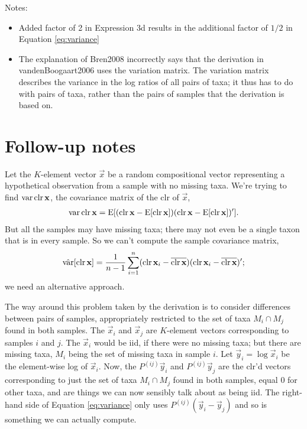 Notes:
\begin{itemize}
  \item Added factor of 2 in Expression 3d results in the additional factor of
    $1/2$ in Equation \eqref{eq:variance}
  \item The explanation of Bren2008 incorrectly says that the derivation in
    vandenBoogaart2006 uses the variation matrix. The variation matrix
    describes the variance in the log ratios of all pairs of taxa; it thus has
    to do with pairs of taxa, rather than the pairs of samples that the
    derivation is based on.
\end{itemize}

\section{Follow-up notes}

Let the $K$-element vector $\vec x$ be a random compositional vector
representing a hypothetical observation from a sample with no missing taxa.
We're trying to find $\operatorname{var} \operatorname{clr} \mathbf{x}$, the covariance matrix of the clr of
$\vec x$,
\begin{align*}
  \operatorname{var} \operatorname{clr} \mathbf{x} 
  = \operatorname{E}[ (\operatorname{clr} \mathbf{x} - \operatorname{E}[\operatorname{clr} \mathbf{x}]) (\operatorname{clr} \mathbf{x} - \operatorname{E}[\operatorname{clr}
    \mathbf{x}])'].
\end{align*}
But all the samples may have missing taxa; there may not even be a single taxon
that is in every sample. So we can't compute the sample covariance matrix,
\begin{align*}
  \hat{\operatorname{var}}[\operatorname{clr} \mathbf{x}] =
  \frac{1}{n-1} \sum_{i=1}^n 
    (\operatorname{clr} \mathbf{x}_i - \overline{\operatorname{clr} \mathbf{x}}) 
    (\operatorname{clr} \mathbf{x}_i - \overline{\operatorname{clr} \mathbf{x}})';
\end{align*}
we need an alternative approach. 

The way around this problem taken by the derivation is to consider differences
between pairs of samples, appropriately restricted to the set of taxa $M_i\cap
M_j$ found in both samples.  The $\vec x_i$ and $\vec x_j$ are $K$-element
vectors corresponding to samples $i$ and $j$.  The $\vec x_i$ would be iid, if
there were no missing taxa; but there are missing taxa, $M_i$ being the set of
missing taxa in sample $i$. Let $\vec y_i = \log \vec x_i$ be the element-wise
log of $\vec x_i$. Now, the $P^{(ij)} \vec y_i$ and $P^{(ij)} \vec y_j$ are the
clr'd vectors corresponding to just the set of taxa $M_i \cap M_j$ found in
both samples, equal 0 for other taxa, and are things we can now sensibly talk
about as being iid. The right-hand side of Equation \eqref{eq:variance} only
uses $P^{(ij)} (\vec y_i - \vec y_j)$ and so is something we can
actually compute.


